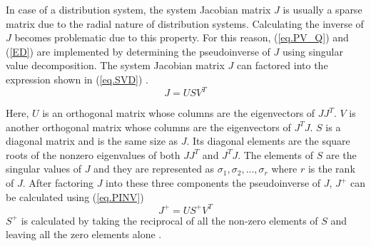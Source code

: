 In case of a distribution system, the system Jacobian matrix $J$ is usually a sparse matrix due to the radial nature of distribution systems. Calculating the inverse of $J$ becomes problematic due to this property. For this reason, (\ref{eq.PV_Q}) and (\ref{ED}) are implemented by determining the pseudoinverse of $J$ using singular value decomposition. The system Jacobian matrix $J$ can factored into the expression shown in (\ref{eq.SVD}) \cite{PINV}.
\begin{equation}\label{eq.SVD}
    J = USV^T
\end{equation}

Here, $U$ is an orthogonal matrix whose columns are the eigenvectors of $JJ^T$. $V$ is another orthogonal matrix whose columns are the eigenvectors of $J^{T}J$. $S$ is a diagonal matrix and is the same size as $J$. Its diagonal elements are the square roots of the nonzero eigenvalues of both $JJ^T$ and $J^{T}J$. The elements of $S$ are the singular values of $J$ and they are represented as $\sigma_1, \sigma_2, ..., \sigma_r$ where $r$ is the rank of $J$. After factoring $J$ into these three components the pseudoinverse of $J$, $J^+$ can be calculated using (\ref{eq.PINV}) \cite{PINV}
\begin{equation}\label{eq.PINV}
    J^+ = US^{+}V^T
\end{equation}
$S^+$ is calculated by taking the reciprocal of all the non-zero elements of $S$ and leaving all the zero elements alone \cite{PINV}.  